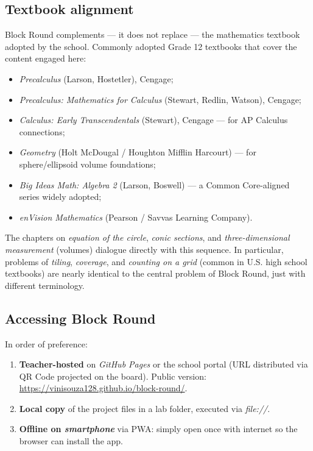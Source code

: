 \documentclass[12pt,a4paper]{scrartcl}
\begin{document}
\subsection{Textbook alignment}\label{sec:textbook}

Block Round complements --- it does not replace --- the mathematics textbook adopted by the school. Commonly adopted Grade 12 textbooks that cover the content engaged here:

\begin{itemize}[leftmargin=1.3em,itemsep=0.1em,topsep=0.2em,nosep]
  \item \emph{Precalculus} (Larson, Hostetler), Cengage;
  \item \emph{Precalculus: Mathematics for Calculus} (Stewart, Redlin, Watson), Cengage;
  \item \emph{Calculus: Early Transcendentals} (Stewart), Cengage --- for AP Calculus connections;
  \item \emph{Geometry} (Holt McDougal / Houghton Mifflin Harcourt) --- for sphere/ellipsoid volume foundations;
  \item \emph{Big Ideas Math: Algebra 2} (Larson, Boswell) --- a Common Core-aligned series widely adopted;
  \item \emph{enVision Mathematics} (Pearson / Savvas Learning Company).
\end{itemize}

The chapters on \emph{equation of the circle}, \emph{conic sections}, and \emph{three-dimensional measurement} (volumes) dialogue directly with this sequence. In particular, problems of \emph{tiling}, \emph{coverage}, and \emph{counting on a grid} (common in U.S. high school textbooks) are nearly identical to the central problem of Block Round, just with different terminology.

\subsection{Accessing Block Round}

In order of preference:

\begin{enumerate}[leftmargin=1.5em,itemsep=0.15em,topsep=0.3em]
  \item \textbf{Teacher-hosted} on \emph{GitHub Pages} or the school portal (URL distributed via QR Code projected on the board). Public version: \url{https://vinisouza128.github.io/block-round/}.
  \item \textbf{Local copy} of the project files in a lab folder, executed via \emph{file://}.
  \item \textbf{Offline on \emph{smartphone}} via PWA: simply open once with internet so the browser can install the app.
\end{enumerate}
\end{document}
